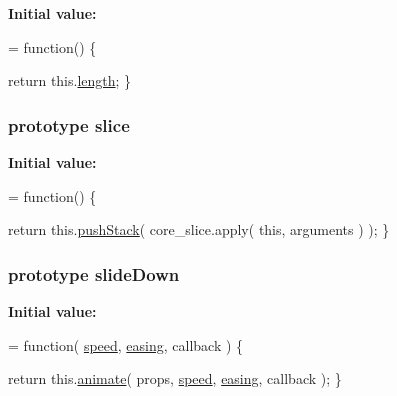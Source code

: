 {\bfseries Initial value\-:}
\begin{DoxyCode}
= \textcolor{keyword}{function}() \{


    \textcolor{keywordflow}{return} this.\hyperlink{jquery-1_810_82-vsdoc_8js_aa7de35d58da66d9944ab9cbe82c19640}{length};
\}
\end{DoxyCode}
\hypertarget{jquery-1_810_82-vsdoc_8js_aea626f23fa5ea32b9d1c600d9c97d97d}{
\subsubsection[{slice}]{ {\bf prototype} slice}}\label{jquery-1_810_82-vsdoc_8js_aea626f23fa5ea32b9d1c600d9c97d97d}
{\bfseries Initial value\-:}
\begin{DoxyCode}
= \textcolor{keyword}{function}() \{


        \textcolor{keywordflow}{return} this.\hyperlink{jquery-1_810_82-vsdoc_8js_afc3a7db1ef2b526338c06c07cecccd44}{pushStack}( core\_slice.apply( \textcolor{keyword}{this}, arguments ) );
    \}
\end{DoxyCode}
\hypertarget{jquery-1_810_82-vsdoc_8js_a9427ab906512c0f37fcb19a16acc9475}{
\subsubsection[{slide\-Down}]{ {\bf prototype} slide\-Down}}\label{jquery-1_810_82-vsdoc_8js_a9427ab906512c0f37fcb19a16acc9475}
{\bfseries Initial value\-:}
\begin{DoxyCode}
= \textcolor{keyword}{function}( \hyperlink{jquery-1_810_82-vsdoc_8js_add98c90065e6563cba26ff6d2016c46c}{speed}, \hyperlink{jquery-1_810_82-vsdoc_8js_a9758a312629fa6de1744280dd6e6253b}{easing}, callback ) \{


        \textcolor{keywordflow}{return} this.\hyperlink{jquery-1_810_82-vsdoc_8js_a956a1d08128d41115c45b6815814a64d}{animate}( props, \hyperlink{jquery-1_810_82-vsdoc_8js_add98c90065e6563cba26ff6d2016c46c}{speed}, \hyperlink{jquery-1_810_82-vsdoc_8js_a9758a312629fa6de1744280dd6e6253b}{easing}, callback );
    \}
\end{DoxyCode}
